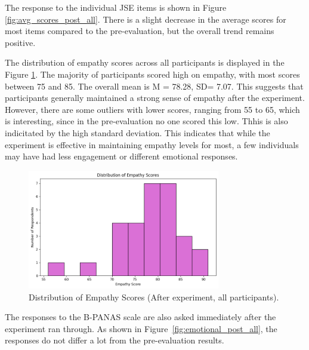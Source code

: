  The response to the individual JSE items is shown in Figure \ref{fig:avg_scores_post_all}. There is a slight decrease in the average scores for most items compared to the pre-evaluation, but the overall trend remains positive. 

\vspace{1em}

The distribution of empathy scores across all participants is displayed in the Figure \ref{fig:empathy_scores_post_all}. The majority of participants scored high on empathy, with most scores between 75 and 85. The overall mean is M = 78.28, SD= 7.07. This suggests that participants generally maintained a strong sense of empathy after the experiment. However, there are some outliers with lower scores, ranging from 55 to 65, which is interesting, since in the pre-evaluation no one scored this low. Thhis is also indicitated by the high standard deviation. This indicates that while the experiment is effective in maintaining empathy levels for most, a few individuals may have had less engagement or different emotional responses.

\begin{figure}[H]
\centering
\includegraphics[width=0.75\textwidth]{../../Figures/empathy_scores_post_all.png}
\caption{Distribution of Empathy Scores (After experiment, all participants).}
\label{fig:empathy_scores_post_all}
\end{figure}

\vspace{1em}

The responses to the B-PANAS scale are also asked immediately after the experiment ran through. As shown in Figure~\ref{fig:emotional_post_all}, the responses do not differ a lot from the pre-evaluation results. 

